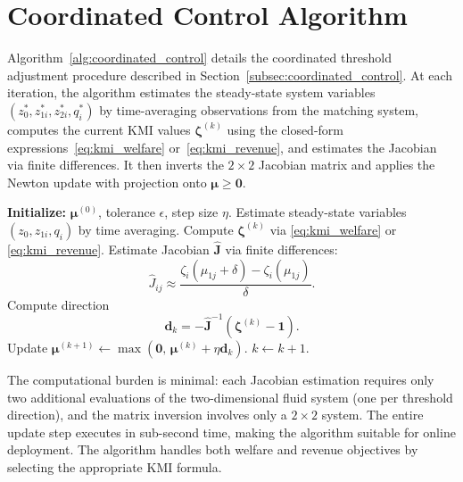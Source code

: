 \section{Coordinated Control Algorithm}
\label{app:algorithm}

Algorithm~\ref{alg:coordinated_control} details the coordinated threshold adjustment procedure described in Section~\ref{subsec:coordinated_control}.
At each iteration, the algorithm estimates the steady-state system variables $(z_0^*, z_{1i}^*, z_{2i}^*, q_i^*)$ by time-averaging observations from the matching system, computes the current KMI values $\boldsymbol{\zeta}^{(k)}$ using the closed-form expressions~\eqref{eq:kmi_welfare} or~\eqref{eq:kmi_revenue}, and estimates the Jacobian via finite differences.
It then inverts the $2 \times 2$ Jacobian matrix and applies the Newton update with projection onto $\boldsymbol{\mu} \geq \mathbf{0}$.

\begin{algorithm}
\caption{Coordinated Threshold Adjustment (Newton--Raphson Type)}
\label{alg:coordinated_control}
\begin{algorithmic}[1]
\State \textbf{Initialize:} $\boldsymbol{\mu}^{(0)}$, tolerance $\epsilon$, step size $\eta$.
    \State Estimate steady-state variables $(z_0,z_{1i},q_i)$ by time averaging.
    \State Compute $\boldsymbol{\zeta}^{(k)}$ via \eqref{eq:kmi_welfare} or \eqref{eq:kmi_revenue}.
    \State Estimate Jacobian $\hat{\mathbf{J}}$ via finite differences:
    \begin{equation*}
      \hat{J}_{ij}
      \approx
      \frac{\zeta_i(\mu_{1j}+\delta)-\zeta_i(\mu_{1j})}{\delta}.
    \end{equation*}
    \State Compute direction
    \begin{equation*}
      \mathbf{d}_k
      =
      -\hat{\mathbf{J}}^{-1}
      (\boldsymbol{\zeta}^{(k)}-\mathbf{1}).
    \end{equation*}
    \State Update
    $\boldsymbol{\mu}^{(k+1)}
    \leftarrow
    \max(\mathbf{0},\,\boldsymbol{\mu}^{(k)}+\eta\mathbf{d}_k)$.
    \State $k\leftarrow k+1$.
\EndWhile
\end{algorithmic}
\end{algorithm}

The computational burden is minimal: each Jacobian estimation requires only two additional evaluations of the two-dimensional fluid system (one per threshold direction), and the matrix inversion involves only a $2 \times 2$ system.
The entire update step executes in sub-second time, making the algorithm suitable for online deployment.
The algorithm handles both welfare and revenue objectives by selecting the appropriate KMI formula.

